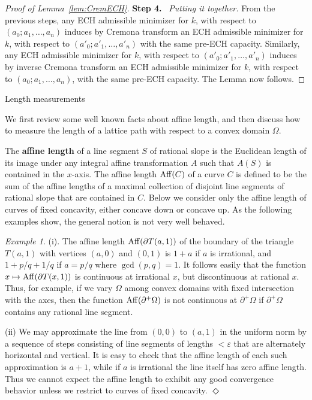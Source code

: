 \documentclass[11pt, reqno]{amsart}
\makeatletter
\def\subsection{\@startsection{subsection}{2}%
  \z@{.75\linespacing\@plus.7\linespacing}{-.5em}%
  {\normalfont\large\bfseries}}
\theoremstyle{remark}
\numberwithin{equation}{subsection}
\numberwithin{figure}{section}
\theoremstyle{customremark}
\newtheorem{example_no_diamond}[thm]{Example}
\newenvironment{example}{\begin{example_no_diamond} } {\hfill$\er$ \end{example_no_diamond}}
\newcommand{\Aff}{{\rm Aff}}
\newcommand{\NI}{{\noindent}}
\newcommand{\Om}{{\Omega}}
\newcommand{\p}{{\partial}}
\newcommand{\MS}{{\medskip}}
\newcommand{\er}{{\Diamond}}
\newcommand{\eps}{\varepsilon}
\makeatother
\begin{document}
\begin{proof}[Proof of Lemma~\ref{lem:CremECH}]
\vspace{2mm}
\NI {\bf Step 4.} \ {\it  Putting it together.}  From the previous steps, any ECH admissible minimizer for $k$, with respect to $(a_0; a_1, \ldots, a_n)$ induces by Cremona transform an ECH admissible minimizer for $k$, with respect to $(a'_0; a'_1, \ldots, a'_n)$
with the same pre-ECH capacity.  Similarly, any ECH admissible minimizer for $k$, with respect to $(a'_0; a'_1, \ldots, a'_n)$ induces by inverse Cremona transform an ECH admissible minimizer for $k$, with respect to $(a_0; a_1, \ldots, a_n)$, with the same pre-ECH capacity.  The Lemma now follows.
\end{proof}

 






\subsection{Length measurements}\label{ss:length}

We first review some well known facts about affine length, and then discuss how to measure the length of a lattice path with respect to a convex domain $\Om$.


The {\bf affine length} of a line segment $S$ of rational slope is the Euclidean length of its image under any integral affine transformation $A$ such that $A(S)$ is contained in the $x$-axis.
The affine length
$\Aff(C)$ of a curve $C$  is defined to be the sum of the affine lengths of a maximal collection of disjoint line  segments of rational  slope
that are contained in $C$.  
Below we consider only the affine length of curves of fixed concavity, either concave down or concave up. As the following examples show, the general notion is not very well behaved.

\begin{example}\label{ex:afflength}\rm (i). The affine length $\Aff(\p T(a,1))$ of the boundary of the triangle $T(a,1)$ with vertices $(a,0)$ and $(0,1)$ is $1+a$ if $a$ is irrational, and $1 + p/q + 1/q$ if  $a = p/q$ where $\gcd(p,q) = 1$.  It follows easily that the function $x\mapsto \Aff(\p T(x,1))$ is continuous at irrational $x$, but discontinuous at rational $x$.  Thus, for example, if 
we vary $\Om$ among  convex domains with fixed intersection with the axes, then 
the function $\Aff(\p^+\Om)$ is not continuous at $\p^+\Om$
 if $\p^+ \Om$ contains any rational line segment. \MS


\NI (ii) We may approximate the line from $(0,0)$ to $(a,1)$  in the uniform norm by a sequence of steps consisting of line segments of lengths $< \eps$  that are alternately horizontal and vertical. It is easy to check that the affine length of each such approximation is $a+1$, while if $a$ is irrational the line itself has zero affine length.
Thus we cannot expect the affine length to exhibit any good convergence behavior unless we restrict to curves of fixed concavity.
\end{example}
\end{document}
